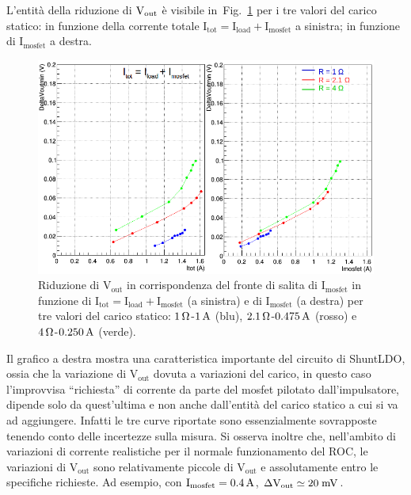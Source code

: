L'entit\`a della riduzione di $\mathrm{V_{out}}$ \`e visibile in~Fig.~\ref{VoutUnd} per i tre valori del carico statico: in funzione della corrente totale $\mathrm{I_{tot} = I_{load}+I_{mosfet}}$ a sinistra; in funzione di $\mathrm{I_{mosfet}}$ a destra. 
\begin{figure}
\centering
\includegraphics[width=0.9\linewidth]{Immagini/VoutUnd}
\caption{Riduzione di $\mathrm{V_{out}}$ in corrispondenza del fronte di salita di $\mathrm{I_{mosfet}}$ in funzione di $\mathrm{I_{tot} = I_{load}+I_{mosfet}}$ (a sinistra) e di $\mathrm{I_{mosfet}}$ (a destra) per tre valori del carico statico: $1{\rm \, \Omega}$-$1\rm \, A$ (blu), $2.1{\rm \, \Omega}$-$0.475\rm \, A$ (rosso) e $4{\rm \, \Omega}$-$0.250\rm \, A$ (verde).}
\label{VoutUnd}
\end{figure}
Il grafico a destra mostra una caratteristica importante del circuito di ShuntLDO, ossia che la variazione di $\mathrm{V_{out}}$ dovuta a variazioni del carico, in questo caso l'improvvisa ``richiesta'' di corrente da parte del mosfet pilotato dall'impulsatore, dipende solo da quest'ultima e non anche dall'entit\`a del carico statico a cui si va ad aggiungere. Infatti le tre curve riportate sono essenzialmente sovrapposte tenendo conto delle incertezze sulla misura.
Si osserva inoltre che, nell'ambito di variazioni di corrente realistiche per il normale funzionamento del ROC, le variazioni di $\mathrm{V_{out}}$ sono relativamente piccole di $\mathrm{V_{out}}$ e assolutamente entro le specifiche richieste. Ad esempio, con $\mathrm{I_{mosfet}= 0.4\rm \, A}$, $\mathrm{\Delta V_{out} \simeq 20\rm \; mV}$.


